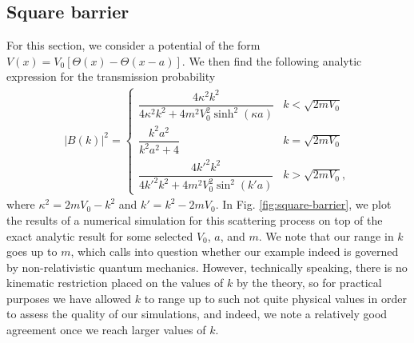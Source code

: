\subsection{Square barrier}
\label{ssec:square-barrier}

For this section, we consider a potential of the form $V(x) = V_0 [ \Theta(x) - \Theta(x - a) ]$.
We then find the following analytic expression for the transmission probability
\begin{align}
\label{eq:square-barrier-Pt}
    |B(k)|^2 = 
    \begin{cases}
        \dfrac{4 \kappa^2 k^2}{4 \kappa^2 k^2 + 4 m^2 V_0^2 \sinh^2(\kappa a)} & k < \sqrt{2 m V_0} \\
        \dfrac{k^2 a^2}{k^2 a^2 + 4} & k = \sqrt{2 m V_0} \\
        \dfrac{4 k'^2 k^2}{4 k'^2 k^2 + 4 m^2 V_0^2 \sin^2(k' a)} & k > \sqrt{2 m V_0}
    ,\end{cases}
\end{align}
where $\kappa^2 = 2 m V_0 - k^2$ and $k' = k^2 - 2 m V_0$.
In Fig. \ref{fig:square-barrier}, we plot the results of a numerical simulation for this scattering process on top of the exact analytic result for some selected $V_0$, $a$, and $m$.
We note that our range in $k$ goes up to $m$, which calls into question whether our example indeed is governed by non-relativistic quantum mechanics.
However, technically speaking, there is no kinematic restriction placed on the values of $k$ by the theory, so for practical purposes we have allowed $k$ to range up to such not quite physical values in order to assess the quality of our simulations, and indeed, we note a relatively good agreement once we reach larger values of $k$.

